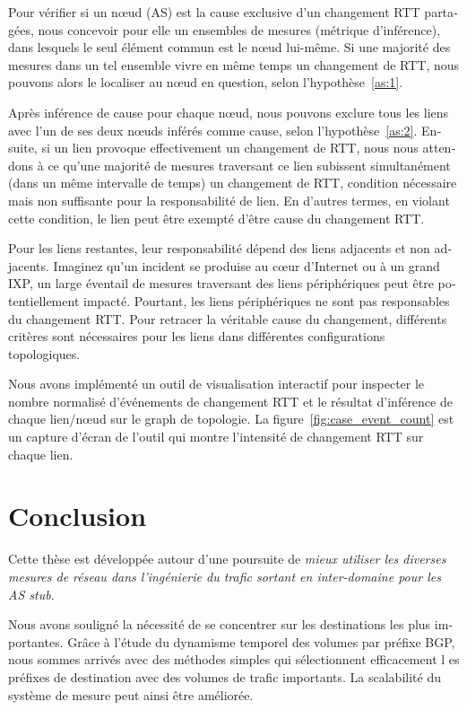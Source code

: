 \begin{otherlanguage}{french}
Pour vérifier si un nœud (AS) est la cause exclusive d'un changement RTT partagées, nous
concevoir pour elle un ensembles de mesures (métrique d'inférence), dans lesquels le seul élément commun est le nœud lui-même. 
Si une majorité des mesures dans un tel ensemble vivre en même temps un changement de RTT, 
nous pouvons alors le localiser au nœud en question, selon l'hypothèse~\ref{as:1}.

Après inférence de cause pour chaque nœud, nous pouvons exclure tous les liens avec l'un de ses deux nœuds inférés comme cause, selon l'hypothèse~\ref{as:2}.
Ensuite, si un lien provoque effectivement un changement de RTT, 
nous nous attendons à ce qu'une majorité de mesures traversant ce lien subissent simultanément (dans un même intervalle de temps) un changement de RTT, 
condition nécessaire mais non suffisante pour la responsabilité de lien. 
En d'autres termes, en violant cette condition, le lien peut être exempté d'être cause du changement RTT.

Pour les liens restantes, leur responsabilité dépend des liens adjacents et non adjacents. 
Imaginez qu'un incident se produise au cœur d'Internet ou à un grand IXP, 
un large éventail de mesures traversant des liens périphériques peut être potentiellement impacté. 
Pourtant, les liens périphériques ne sont pas responsables du changement RTT.
Pour retracer la véritable cause du changement, différents critères sont nécessaires pour les liens dans différentes configurations topologiques.

Nous avons implémenté un outil de visualisation interactif pour inspecter le nombre normalisé d'événements de changement RTT 
et le résultat d'inférence de chaque lien/nœud sur le graph de topologie.
La figure~\ref{fig:case_event_count} est un capture d'écran de l'outil qui montre l'intensité de changement RTT sur chaque lien.

\section*{Conclusion}

Cette thèse est développée autour d'une poursuite de 
\textit{mieux utiliser les diverses mesures de réseau dans l'ingénierie du trafic sortant en inter-domaine pour les AS stub}.

Nous avons souligné la nécessité de se concentrer sur les destinations les plus importantes.
Grâce à l'étude du dynamisme temporel des volumes par préfixe BGP,
nous sommes arrivés avec des méthodes simples qui sélectionnent efficacement l
es préfixes de destination avec des volumes de trafic importants.
La scalabilité du système de mesure peut ainsi être améliorée.


\end{otherlanguage}
